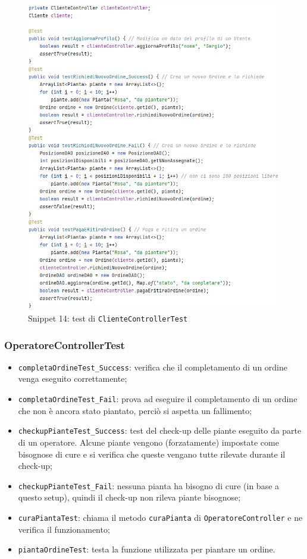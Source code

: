 \documentclass{article}
\newcommand{\code}[1]{\texttt{#1}}
\begin{document}
\begin{figure}[H]
    \centering
    \includegraphics[scale=0.5]{resources/images/Snippets/snippet_ClienteControllerTest.png}
    \captionsetup{labelformat=empty,labelsep=none}
    \caption{Snippet 14: test di \code{ClienteControllerTest}}
    \label{fig:snippet_ClienteControllerTest}
\end{figure}

\subsubsection{OperatoreControllerTest}
\begin{itemize}
    \item \code{completaOrdineTest\_Success}: verifica che il completamento di un ordine venga eseguito correttamente;
    \item \code{completaOrdineTest\_Fail}: prova ad eseguire il completamento di un ordine che non è ancora stato piantato, perciò si aspetta un fallimento;
    \item \code{checkupPianteTest\_Success}: test del check-up delle piante eseguito da parte di un operatore. Alcune piante vengono (forzatamente) impostate come bisognose di cure e si verifica che queste vengano tutte rilevate durante il check-up;
    \item \code{checkupPianteTest\_Fail}: nessuna pianta ha bisogno di cure (in base a questo setup), quindi il check-up non rileva piante bisognose;
    \item \code{curaPiantaTest}: chiama il metodo \code{curaPianta} di \code{OperatoreController} e ne verifica il funzionamento;
    \item \code{piantaOrdineTest}: testa la funzione utilizzata per piantare un ordine.
\end{itemize}
\end{document}
